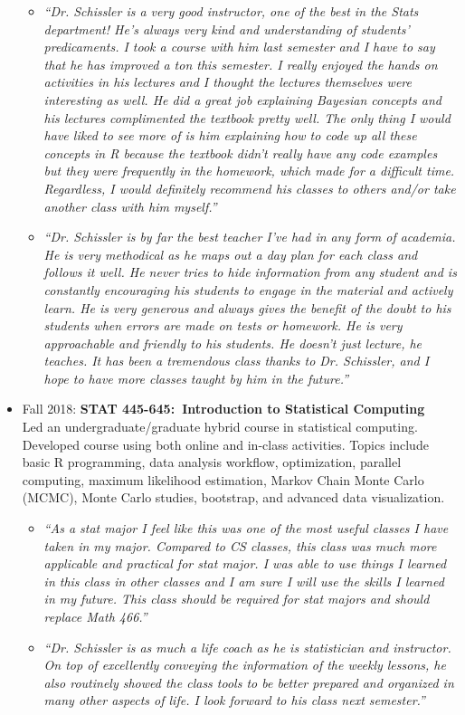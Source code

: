 \documentclass[paper=a4,fontsize=11pt]{scrartcl} %
\newcommand{\CourseEntry}[3]{
		\noindent \item{#1: \textbf{#2} \\ #3}}
\begin{document}
\begin{itemize}[noitemsep]
{\begin{itemize}
\item \emph{\small{``Dr. Schissler is a very good instructor, one of the best in the Stats department! He's always very kind and understanding of students' predicaments. I took a course with him last semester and I have to say that he has improved a ton this semester. I really enjoyed the hands on activities in his lectures and I thought the lectures themselves were interesting as well. He did a great job explaining Bayesian concepts and his lectures
complimented the textbook pretty well. The only thing I would have liked to see more of is him explaining how to
code up all these concepts in R because the textbook didn't really have any code examples but they were
frequently in the homework, which made for a difficult time. Regardless, I would definitely recommend his classes
to others and/or take another class with him myself.''}}
\item \emph{\small{``Dr. Schissler is by far the best teacher I've had in any form of academia. He is very methodical as he maps out a day plan for each class and follows it well. He never tries to hide information from any student and is constantly encouraging his students to engage in the material and actively learn. He is very generous and always gives the benefit of the doubt to his students when errors are made on tests or homework. He is very approachable and friendly to his students. He doesn't just lecture, he teaches. It has been a tremendous class thanks to Dr. Schissler, and I hope to have more classes taught by him in the future.''}}
\end{itemize}
}{} 

\CourseEntry{Fall 2018}{STAT 445-645:~Introduction to Statistical Computing}{Led an undergraduate/graduate hybrid course in statistical computing. Developed course using both online and in-class activities. Topics include basic R programming, data analysis workflow, optimization, parallel computing, maximum likelihood estimation, Markov Chain Monte Carlo (MCMC), Monte Carlo studies, bootstrap, and advanced data visualization.

\begin{itemize}
\item \emph{\small{``As a stat major I feel like this was one of the most useful classes I have taken in my major. Compared to CS classes, this class was much more applicable and practical for stat major. I was able to use things I learned in this class in other classes and I am sure I will use the skills I learned in my future. This class should be required for stat majors and should replace Math 466.''}}
\item \emph{\small{``Dr. Schissler is as much a life coach as he is statistician and instructor. On top of excellently conveying the information of the weekly lessons, he also routinely showed the class tools to be better prepared and organized in many other aspects of life. I look forward to his class next semester.''}}
\end{itemize}
}{} 


\end{itemize}
\end{document}
